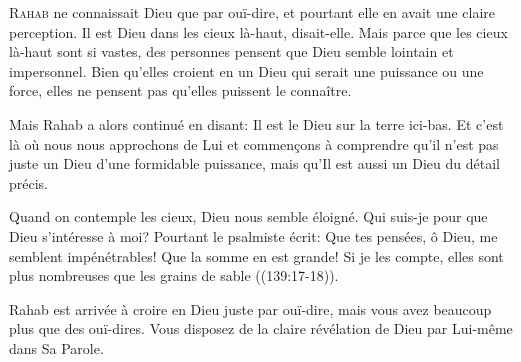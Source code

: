 \dvrule







\lettrine{R}{ahab} ne connaissait Dieu que par ouï-dire,
 et pourtant elle en avait une claire perception.
 \Og Il est Dieu dans les cieux là-haut, \Fg{} disait-elle.
 Mais parce que les cieux là-haut sont si vastes,
 des personnes pensent que Dieu semble lointain et impersonnel.
 Bien qu'elles croient en un Dieu qui serait une puissance ou une force,
 elles ne pensent pas qu'elles puissent le connaître.

Mais Rahab a alors continué en disant:
 \Og Il est le Dieu sur la terre ici-bas. \Fg{}
 Et c'est là où nous nous approchons de Lui
 et commen\c{c}ons à comprendre qu'il n'est pas juste un Dieu
 d'une formidable puissance, mais qu'Il est aussi un Dieu du détail précis.

Quand on contemple les cieux, Dieu nous semble éloigné.
 Qui suis-je pour que Dieu s'intéresse à moi?
 Pourtant le psalmiste écrit:
 \Og Que tes pensées, ô Dieu, me semblent impénétrables!
 Que la somme en est grande! Si je les compte, elles sont plus nombreuses
 que les grains de sable \Fg{} ((139:17-18)).


Rahab est arrivée à croire en Dieu juste par ouï-dire,
 mais vous avez beaucoup plus que des ouï-dires.
 Vous disposez de la claire révélation de Dieu par Lui-même dans Sa Parole.

\dvrule

